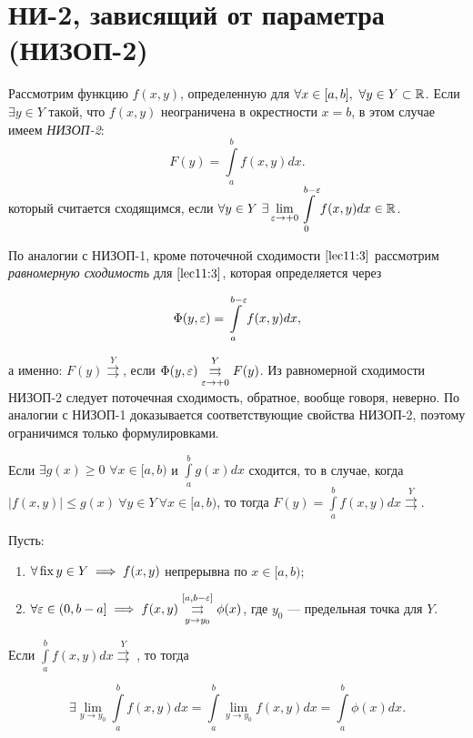 \documentclass[../../main.tex]{subfiles}
\begin{document}
\section{НИ-2, зависящий от параметра (НИЗОП-2)}

	Рассмотрим функцию $f(x, y)$, определенную для $\forall x \in [a, b],\ 
	\forall 
	y \in Y \subset \R$. Если ${\exists y \in Y}$ такой, что $f(x, y)$ 
	неограничена в 
	окрестности $x = b$, в этом случае имеем \emph{НИЗОП-2}:
	\begin{equation}\label{lec11:3}
		F(y) = \int\limits_a^b f(x, y) dx.
	\end{equation}
	который считается сходящимся, если $\forall y \in Y\ \displaystyle \exists 
	\lim_{\varepsilon \rightarrow 
	+0} \int\limits_0^{b - \varepsilon} f(x, y) dx \in \mathbb{R}$.
	
	По аналогии с НИЗОП-1, кроме поточечной сходимости $\eqref{lec11:3}$ 
	рассмотрим \emph{равномерную сходимость} для $\eqref{lec11:3}$, которая 
	определяется 
	через 
	
	\begin{equation}\label{lec11:4}
		\Phi(y, \varepsilon) = \int\limits_a^{b - \varepsilon} f(x, y) dx,
	\end{equation}
	
	а именно: $F(y) \overset{Y}\rightrightarrows$, если $\Phi(y, \varepsilon) 
	\overset{Y}{\underset{\varepsilon \rightarrow +0}\rightrightarrows} F(y)$. Из 
	равномерной сходимости НИЗОП-2 следует поточечная сходимость, обратное, 
	вообще говоря, неверно. По аналогии с НИЗОП-1 доказывается соответствующие 
	свойства НИЗОП-2, поэтому ограничимся только формулировками.
	
	\begin{thm}
		Если $\exists {g(x) \geq 0}$ $\forall x \in [a, b)$ и $\int\limits_a^b g(x) 
		dx$ 
		сходится, то в случае, когда $|f(x, y)| \leq g(x)\ \forall y \in Y\ \forall 
		x \in [a, b)$, то тогда $F(y) = \int\limits_a^b f(x, y) dx 
		\overset{Y}{\rightrightarrows}$.
	\end{thm}
	
	\begin{thm}
		Пусть:
		
		\begin{enumerate}
			\item $\forall \operatorname{fix} y \in Y \implies f(x, y)$ непрерывна по $x \in [a, 
			b)$;
			\item $\forall \varepsilon \in (0, b - a] \implies f(x, y) \overset{[a, b - 
			\varepsilon]}{\underset{y \rightarrow y_0}\rightrightarrows} \phi(x)$, где $y_0$ 
			--- предельная точка для $Y$.
		\end{enumerate}
		
		Если $\int\limits_a^b f(x, y) dx \overset{Y}\rightrightarrows \;$, то тогда 
		
		\begin{equation}\label{lec11:5}
			\exists \lim_{y \rightarrow y_0} \int\limits_a^b f(x, y) dx = 
			\int\limits_a^b \lim_{y \rightarrow y_0} f(x, y) dx = \int\limits_a^b 
			\phi(x) dx.
		\end{equation}
	\end{thm}
\end{document}
